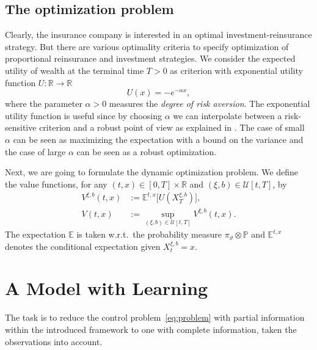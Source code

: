 \documentclass[reqno, 11pt]{amsart}%
\newcommand{\R}{\mathbb{R}}
\newcommand{\Eop}{\mathbb{E}}
\newcommand{\Pop}{\mathbb{P}}
\theoremstyle{definition}
\numberwithin{equation}{section} \numberwithin{theorem}{section}
\begin{document}
\subsection{The optimization problem}
Clearly, the insurance company is interested in an optimal investment-reinsurance strategy. But there are various optimality criteria to specify optimization of proportional reinsurance and investment strategies.  We consider the expected utility of wealth at the terminal time $T>0$ as criterion with
exponential utility function $U:\R\to\R$ 
\begin{equation}\label{eq:u}
U(x)=-e^{-\alpha x},
\end{equation}
where the parameter $\alpha>0$ measures the \emph{degree of risk aversion}. The exponential utility function is useful since by choosing $\alpha$ we can interpolate between a risk-sensitive criterion and a robust point of view as explained in \cite{BaeuerleLeimcke2020}. The case of small $\alpha $ can be seen as maximizing the expectation with a bound on the variance and the case of large $\alpha$ can be seen as a robust optimization.

Next, we are going to formulate the dynamic optimization problem. 
We define the value functions, for any $(t,x)\in[0,T]\times\R$ and $(\xi,b)\in{\mathcal U}[t,T]$, by
\begin{equation}\label{eq:problem} %
\begin{aligned}
V^{\xi,b}(t,x) &:= \Eop^{t,x}\big[U(X^{\xi,b}_T)\big],  \\
V(t,x) &:= \sup_{(\xi,b)\in{\mathcal U}[t,T]}V^{\xi,b}(t,x).
\end{aligned}
\end{equation}
The expectation $\Eop$ is taken w.r.t.\ the  probability measure $\pi_\vartheta \otimes\Pop$ and $\Eop^{t,x}$ denotes the conditional expectation given $X^{\xi,b}_t=x$. 



\section{A Model with Learning}\label{sec:learn}

The task is to reduce the control problem~\eqref{eq:problem} with partial information within the introduced framework to one with complete information, taken the observations into account. 
\end{document}
